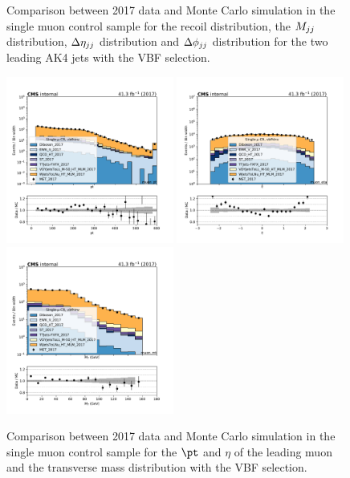 \begin{figure}[htbp]
\begin{center}
    \end{center}
    \caption{Comparison between 2017 data and Monte Carlo simulation in the single muon control sample for
        the recoil distribution, the $M_{jj}$ distribution, $\Delta \eta_{jj}$ distribution
        and $\Delta \phi_{jj}$ distribution for the two leading AK4 jets with the VBF selection.}
    \label{fig:SM_vbfhinv_2017}
\end{figure}

\begin{figure}[htbp]
    \begin{center}
        \includegraphics[width=0.49\textwidth]{fig/datamc/cr_1m_vbf/cr_1m_vbf_muon_pt_losf_2017.pdf}
        \includegraphics[width=0.49\textwidth]{fig/datamc/cr_1m_vbf/cr_1m_vbf_muon_eta_losf_2017.pdf} \\
        \includegraphics[width=0.49\textwidth]{fig/datamc/cr_1m_vbf/cr_1m_vbf_muon_mt_losf_2017.pdf}
    \end{center}
    \caption{Comparison between 2017 data and Monte Carlo simulation in the single muon control sample for
        the $\pt$ and $\eta$ of the leading muon and the transverse mass distribution with the VBF selection.}
    \label{fig:SM_2_vbfhinv_2017}
\end{figure}

